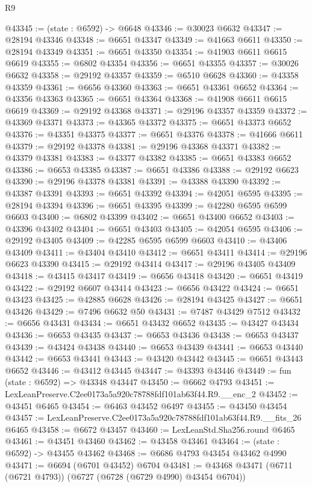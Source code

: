 \begin{lexlean}{R9}
\begin{coremodule}
@43345 := (state : @6592) -> @6648
@43346 := @30023 @6632
@43347 := @28194 @43346
@43348 := @6651 @43347
@43349 := @41663 @6611
@43350 := @28194 @43349
@43351 := @6651 @43350
@43354 := @41903 @6611 @6615 @6619
@43355 := @6802 @43354
@43356 := @6651 @43355
@43357 := @30026 @6632
@43358 := @29192 @43357
@43359 := @6510 @6628
@43360 := @43358 @43359
@43361 := @6656 @43360
@43363 := @6651 @43361 @6652
@43364 := @43356 @43363
@43365 := @6651 @43364
@43368 := @41908 @6611 @6615 @6619
@43369 := @29192 @43368
@43371 := @29196 @43357 @43359
@43372 := @43369 @43371
@43373 := @43365 @43372
@43375 := @6651 @43373 @6652
@43376 := @43351 @43375
@43377 := @6651 @43376
@43378 := @41666 @6611
@43379 := @29192 @43378
@43381 := @29196 @43368 @43371
@43382 := @43379 @43381
@43383 := @43377 @43382
@43385 := @6651 @43383 @6652
@43386 := @6653 @43385
@43387 := @6651 @43386
@43388 := @29192 @6623
@43390 := @29196 @43378 @43381
@43391 := @43388 @43390
@43392 := @43387 @43391
@43393 := @6651 @43392
@43394 := @42051 @6595
@43395 := @28194 @43394
@43396 := @6651 @43395
@43399 := @42280 @6595 @6599 @6603
@43400 := @6802 @43399
@43402 := @6651 @43400 @6652
@43403 := @43396 @43402
@43404 := @6651 @43403
@43405 := @42054 @6595
@43406 := @29192 @43405
@43409 := @42285 @6595 @6599 @6603
@43410 := @43406 @43409
@43411 := @43404 @43410
@43412 := @6651 @43411
@43414 := @29196 @6623 @43390
@43415 := @29192 @43414
@43417 := @29196 @43405 @43409
@43418 := @43415 @43417
@43419 := @6656 @43418
@43420 := @6651 @43419
@43422 := @29192 @6607 @43414
@43423 := @6656 @43422
@43424 := @6651 @43423
@43425 := @42885 @6628
@43426 := @28194 @43425
@43427 := @6651 @43426
@43429 := @7496 @6632 @50
@43431 := @7487 @43429 @7512
@43432 := @6656 @43431
@43434 := @6651 @43432 @6652
@43435 := @43427 @43434
@43436 := @6653 @43435
@43437 := @6653 @43436
@43438 := @6653 @43437
@43439 := @43424 @43438
@43440 := @6653 @43439
@43441 := @6653 @43440
@43442 := @6653 @43441
@43443 := @43420 @43442
@43445 := @6651 @43443 @6652
@43446 := @43412 @43445
@43447 := @43393 @43446
@43449 := fun (state : @6592) => @43348 @43447
@43450 := @6662 @4793
@43451 := LexLeanPreserve.C2ee0173a5a920c78788fdf101ab63f44.R9.__enc_2
@43452 := @43451 @6465
@43454 := @6463 @43452 @6497
@43455 := @43450 @43454
@43457 := LexLeanPreserve.C2ee0173a5a920c78788fdf101ab63f44.R9.__fits_26 @6465
@43458 := @6672 @43457
@43460 := LexLeanStd.Sha256.round @6465
@43461 := @43451 @43460
@43462 := @43458 @43461
@43464 := (state : @6592) -> @43455 @43462
@43468 := @6686 @4793 @43454 @43462 @4990
@43471 := @6694 (@6701 @43452) @6704
@43481 := @43468 @43471 (@6711 (@6721 @4793)) (@6727 (@6728 (@6729 @4990) @43454 @6704))

\end{coremodule}
\end{lexlean}
